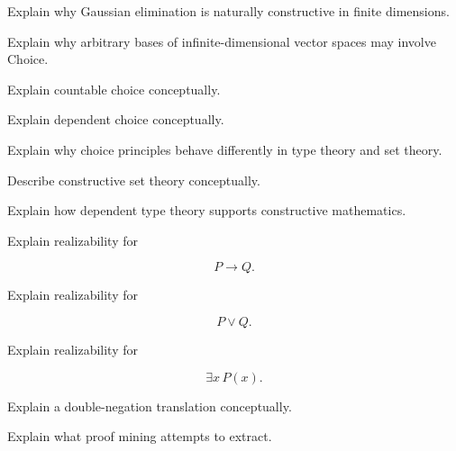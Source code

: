 \begin{exercise}[3]
Explain why Gaussian elimination is naturally constructive in finite
dimensions.
\end{exercise}

\begin{exercise}[3]
Explain why arbitrary bases of infinite-dimensional vector spaces may
involve Choice.
\end{exercise}

\begin{exercise}[3]
Explain countable choice conceptually.
\end{exercise}

\begin{exercise}[3]
Explain dependent choice conceptually.
\end{exercise}

\begin{exercise}[3]
Explain why choice principles behave differently in type theory and set
theory.
\end{exercise}

\begin{exercise}[3]
Describe constructive set theory conceptually.
\end{exercise}

\begin{exercise}[3]
Explain how dependent type theory supports constructive mathematics.
\end{exercise}

\begin{exercise}[3]
Explain realizability for

\[
P\rightarrow Q.
\]
\end{exercise}

\begin{exercise}[3]
Explain realizability for

\[
P\lor Q.
\]
\end{exercise}

\begin{exercise}[3]
Explain realizability for

\[
\exists x\,P(x).
\]
\end{exercise}

\begin{exercise}[3]
Explain a double-negation translation conceptually.
\end{exercise}

\begin{exercise}[3]
Explain what proof mining attempts to extract.
\end{exercise}

